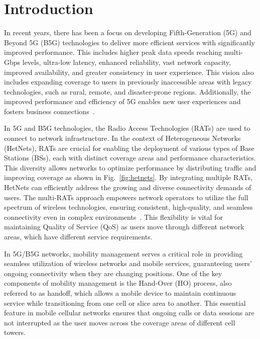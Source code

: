 \documentclass[graybox]{svmult}
\begin{document}

\section{Introduction}
In recent years, there has been a focus on developing Fifth-Generation (5G) and Beyond 5G (B5G) technologies to deliver more efficient services with significantly improved performance. This includes higher peak data speeds reaching multi-Gbps levels, ultra-low latency, enhanced reliability, vast network capacity, improved availability, and greater consistency in user experience. This vision also includes expanding coverage to users in previously inaccessible areas with legacy technologies, such as rural, remote, and disaster-prone regions. Additionally, the improved performance and efficiency of 5G enables new user experiences and fosters business connections~\cite{8985528, 9349624}.

In 5G and B5G technologies, the Radio Access Technologies (RATs) are used to connect to network infrastructure. In the context of Heterogeneous Networks (HetNets), RATs are crucial for enabling the deployment of various types of Base Stations (BSs), each with distinct coverage areas and performance characteristics. This diversity allows networks to optimize performance by distributing traffic and improving coverage as shown in Fig.~\ref{fig:hetnets}. By integrating multiple RATs, HetNets can efficiently address the growing and diverse connectivity demands of users. The multi-RATs approach empowers network operators to utilize the full spectrum of wireless technologies, ensuring consistent, high-quality, and seamless connectivity even in complex environments~\cite{ullah2023survey}. This flexibility is vital for maintaining Quality of Service (QoS) as users move through different network areas, which have different service requirements.

In 5G/B5G networks, mobility management serves a critical role in providing seamless utilization of wireless networks and mobile services, guaranteeing users' ongoing connectivity when they are changing positions. One of the key components of mobility management is the Hand-Over (HO) process, also referred to as handoff, which allows a mobile device to maintain continuous service while transitioning from one cell or slice area to another. This essential feature in mobile cellular networks ensures that ongoing calls or data sessions are not interrupted as the user moves across the coverage areas of different cell towers.
\end{document}
